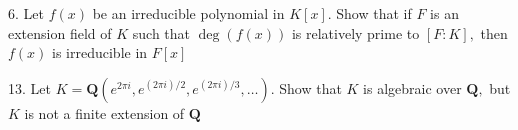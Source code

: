 \begin{mdframed}[style=darkAnswer,frametitle={Joe Starr}]
\end{mdframed}
\newpage
\begin{mdframed}[style=darkQuesion]
6. Let $f(x)$ be an irreducible polynomial in $K[x]$. Show that if $F$ is an extension field of $K$ such that $\operatorname{deg}(f(x))$ is relatively prime to $[F: K],$ then $f(x)$ is irreducible in $F[x]$
\end{mdframed}
\begin{mdframed}[style=darkAnswer,frametitle={Joe Starr}]
\end{mdframed}
\newpage
\begin{mdframed}[style=darkQuesion]
  13. Let $K=\mathbf{Q}\left(e^{2 \pi i}, e^{(2 \pi i) / 2}, e^{(2 \pi i) / 3}, \ldots\right) .$ Show that $K$ is algebraic over $\mathbf{Q},$ but $K$ is not a finite extension of $\mathbf{Q}$
\end{mdframed}
\begin{mdframed}[style=darkAnswer,frametitle={Joe Starr}]
\end{mdframed}
\newpage